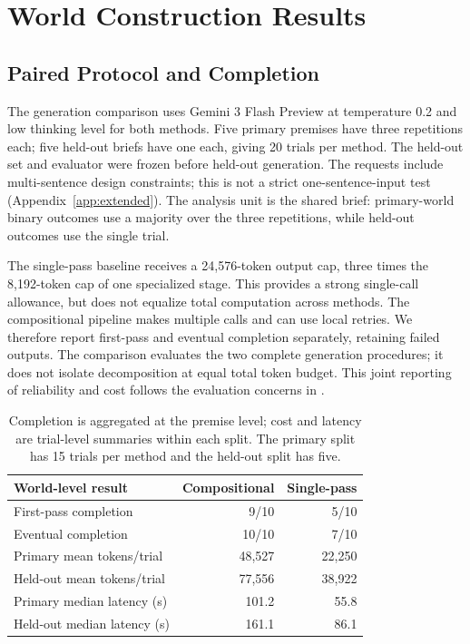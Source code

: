 \section{World Construction Results}
\label{sec:construction}

\subsection{Paired Protocol and Completion}
The generation comparison uses Gemini 3 Flash Preview at temperature 0.2 and
low thinking level for both methods. Five primary premises have three
repetitions each; five held-out briefs have one each, giving 20 trials per
method. The held-out set and evaluator were frozen before held-out generation.
The requests include multi-sentence design constraints; this is not a strict
one-sentence-input test (Appendix~\ref{app:extended}). The analysis unit is the
shared brief: primary-world binary outcomes use a majority
over the three repetitions, while held-out outcomes use the single trial.

The single-pass baseline receives a 24,576-token output cap, three times the
8,192-token cap of one specialized stage. This provides a strong single-call
allowance, but does not equalize total computation across methods. The
compositional pipeline makes multiple calls and can use local retries. We
therefore report first-pass and eventual completion separately, retaining
failed outputs. The comparison evaluates the two complete generation
procedures; it does not isolate decomposition at equal total token budget.
This joint reporting of reliability and cost follows the evaluation concerns
in \citet{agentsmatter}.

\begin{table}[t]
\centering\small
\setlength{\tabcolsep}{4pt}
\begin{tabularx}{\columnwidth}{@{}Yrr@{}}
\toprule
World-level result & Compositional & Single-pass \\
\midrule
First-pass completion & 9/10 & 5/10 \\
Eventual completion & 10/10 & 7/10 \\
\midrule
Primary mean tokens/trial & 48,527 & 22,250 \\
Held-out mean tokens/trial & 77,556 & 38,922 \\
Primary median latency (s) & 101.2 & 55.8 \\
Held-out median latency (s) & 161.1 & 86.1 \\
\bottomrule
\end{tabularx}
\caption{Completion is aggregated at the premise level; cost and latency are
trial-level summaries within each split. The primary split has 15 trials per
method and the held-out split has five.}
\label{tab:quality}
\end{table}

